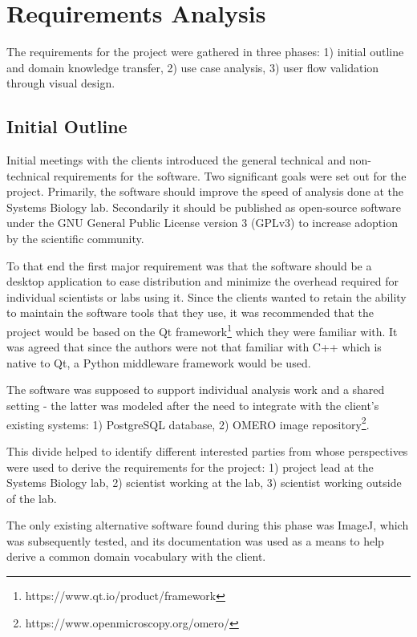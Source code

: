 \section{Requirements Analysis}

The requirements for the project were gathered in three phases: 1) initial outline and domain knowledge transfer, 2) use case analysis, 3) user flow validation through visual design.

\subsection{Initial Outline}

Initial meetings with the clients introduced the general technical and non-technical requirements for the software. Two significant goals were set out for the project. Primarily, the software should improve the speed of analysis done at the Systems Biology lab. Secondarily it should be published as open-source software under the GNU General Public License version 3 (GPLv3) to increase adoption by the scientific community.

To that end the first major requirement was that the software should be a desktop application to ease distribution and minimize the overhead required for individual scientists or labs using it. Since the clients wanted to retain the ability to maintain the software tools that they use, it was recommended that the project would be based on the Qt framework\footnote{https://www.qt.io/product/framework} which they were familiar with. It was agreed that since the authors were not that familiar with C++ which is native to Qt, a Python middleware framework would be used.

The software was supposed to support individual analysis work and a shared setting - the latter was modeled after the need to integrate with the client's existing systems: 1) PostgreSQL database, 2) OMERO image repository\footnote{https://www.openmicroscopy.org/omero/}.

This divide helped to identify different interested parties from whose perspectives were used to derive the requirements for the project: 1) project lead at the Systems Biology lab, 2) scientist working at the lab, 3) scientist working outside of the lab.

The only existing alternative software found during this phase was ImageJ, which was subsequently tested, and its documentation was used as a means to help derive a common domain vocabulary with the client.

